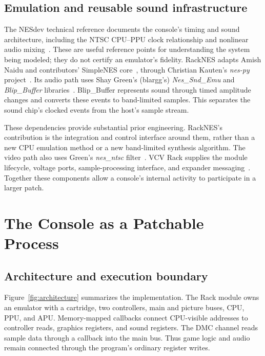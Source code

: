 \documentclass[10pt,letterpaper,twocolumn]{article}
\begin{document}
\subsection{Emulation and reusable sound infrastructure}
The NESdev technical reference documents the console's timing and sound
architecture, including the NTSC CPU--PPU clock relationship and nonlinear
audio mixing~\cite{nesclock,nesmixer}. These are useful reference points for
understanding the system being modeled; they do not certify an emulator's
fidelity. RackNES adapts Amish Naidu and contributors' SimpleNES core~\cite{simplenes},
through Christian Kauten's \emph{nes-py} project~\cite{nespy}. Its audio path uses
Shay Green's (blargg's) \emph{Nes\_Snd\_Emu} and \emph{Blip\_Buffer}
libraries~\cite{green}.
Blip\_Buffer represents sound through timed amplitude changes and converts
these events to band-limited samples. This separates the sound chip's clocked
events from the host's sample stream.

These dependencies provide substantial prior engineering. RackNES's contribution
is the integration and control interface around them, rather than a new CPU
emulation method or a new band-limited synthesis algorithm. The video path
also uses Green's \emph{nes\_ntsc} filter~\cite{ntsc}. VCV Rack supplies the
module lifecycle, voltage ports, sample-processing interface, and expander
messaging~\cite{rack}. Together these components allow a console's internal
activity to participate in a larger patch.

\section{The Console as a Patchable Process}
\subsection{Architecture and execution boundary}
Figure~\ref{fig:architecture} summarizes the implementation. The Rack module
owns an emulator with a cartridge, two controllers, main and picture buses,
CPU, PPU, and APU. Memory-mapped callbacks connect CPU-visible addresses to
controller reads, graphics registers, and sound registers. The DMC channel
reads sample data through a callback into the main bus. Thus game logic and
audio remain connected through the program's ordinary register writes.
\end{document}
